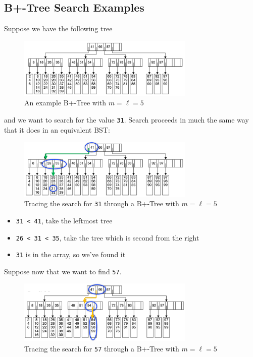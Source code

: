 \documentclass[
  10pt,
  english,
  letterpaper,
,tablecaptionabove
]{scrartcl}
\newcommand{\passthrough}[1]{#1}
\providecommand{\tightlist}{%
  \setlength{\itemsep}{0pt}\setlength{\parskip}{0pt}}
\begin{document}
\hypertarget{b-tree-search-examples}{%
\subsection{B+-Tree Search Examples}\label{b-tree-search-examples}}

Suppose we have the following tree

\begin{figure}
\centering
\includegraphics[width=0.75\textwidth,height=\textheight]{images/4.png}
\caption{An example B+-Tree with \(m=\ell=5\)}
\end{figure}

and we want to search for the value \passthrough{\lstinline!31!}. Search
proceeds in much the same way that it does in an equivalent BST:

\begin{figure}
\centering
\includegraphics[width=0.75\textwidth,height=\textheight]{images/5.png}
\caption{Tracing the search for \passthrough{\lstinline!31!} through a
B+-Tree with \(m=\ell=5\)}
\end{figure}

\begin{itemize}
\tightlist
\item
  \passthrough{\lstinline!31 < 41!}, take the leftmost tree
\item
  \passthrough{\lstinline!26 < 31 < 35!}, take the tree which is second
  from the right
\item
  \passthrough{\lstinline!31!} is in the array, so we've found it
\end{itemize}

Suppose now that we want to find \passthrough{\lstinline!57!}.

\begin{figure}
\centering
\includegraphics[width=0.75\textwidth,height=\textheight]{images/6.png}
\caption{Tracing the search for \passthrough{\lstinline!57!} through a
B+-Tree with \(m=\ell=5\)}
\end{figure}
\end{document}
